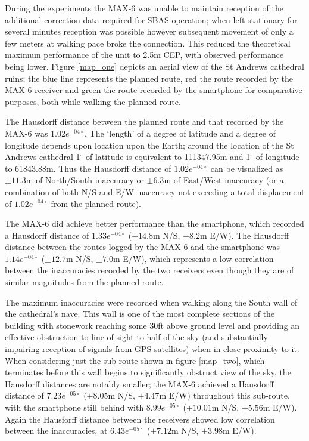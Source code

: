 During the experiments the MAX-6 was unable to maintain reception of the additional correction data required for SBAS operation; when left stationary for several minutes reception was possible however subsequent movement of only a few meters at walking pace broke the connection. This reduced the theoretical maximum performance of the unit to 2.5m CEP, with observed performance being lower. Figure \ref{map_one} depicts an aerial view of the St Andrews cathedral ruins; the blue line represents the planned route, red the route recorded by the MAX-6 receiver and green the route recorded by the smartphone for comparative purposes, both while walking the planned route.


The Hausdorff distance between the planned route and that recorded by the MAX-6 was $1.02e^{-04\circ}$. The `length' of a degree of latitude and a degree of longitude depends upon location upon the Earth; around the location of the St Andrews cathedral 1$^\circ$ of latitude is equivalent to 111347.95m and 1$^\circ$ of longitude to 61843.88m. Thus the Hausdorff distance of $1.02e^{-04\circ}$ can be visualized as $\pm11.3$m of North/South inaccuracy or $\pm6.3$m of East/West inaccuracy (or a combination of both N/S and E/W inaccuracy not exceeding a total displacement of $1.02e^{-04\circ}$ from the planned route).

The MAX-6 did achieve better performance than the smartphone, which recorded a Hausdorff distance of $1.33e^{-04\circ}$ ($\pm14.8$m N/S, $\pm8.2$m E/W). The Hausdorff distance between the routes logged by the MAX-6 and the smartphone was $1.14e^{-04\circ}$ ($\pm12.7$m N/S, $\pm7.0$m E/W), which represents a low correlation between the inaccuracies recorded by the two receivers even though they are of similar magnitudes from the planned route.

The maximum inaccuracies were recorded when walking along the South wall of the cathedral's nave. This wall is one of the most complete sections of the building with stonework reaching some 30ft above ground level and providing an effective obstruction to line-of-sight to half of the sky (and substantially impairing reception of signals from GPS satellites) when in close proximity to it. When considering just the sub-route shown in figure \ref{map_two}, which terminates before this wall begins to significantly obstruct view of the sky, the Hausdorff distances are notably smaller; the MAX-6 achieved a Hausdorff distance of $7.23e^{-05\circ}$ ($\pm8.05$m N/S, $\pm4.47$m E/W) throughout this sub-route, with the smartphone still behind with $8.99e^{-05\circ}$ ($\pm10.01$m N/S, $\pm5.56$m E/W). Again the Hausforff distance between the receivers showed low correlation between the inaccuracies, at $6.43e^{-05\circ}$ ($\pm7.12$m N/S, $\pm3.98$m E/W).
 
